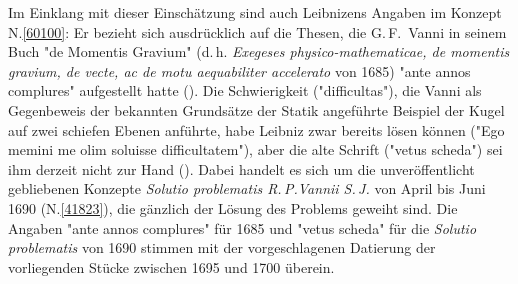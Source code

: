 \begin{ledgroup}
\pstart
Im Einklang mit dieser Einschätzung sind auch Leibnizens Angaben im Konzept N.\;\ref{60100}:
Er bezieht sich ausdrücklich auf die Thesen, die G.\,F.~Vanni in seinem Buch "de Momentis Gravium" (d.\,h. \textit{Exegeses physico-mathematicae, de momentis gravium, de vecte, ac de motu aequabiliter accelerato} von 1685) "ante annos complures" aufgestellt hatte ().
Die Schwierigkeit ("difficultas"), die Vanni als Gegenbeweis der bekannten Grundsätze der Statik angeführte Beispiel der Kugel auf zwei schiefen Ebenen anführte, habe Leibniz zwar bereits lösen können ("Ego memini me olim soluisse difficultatem"), aber die alte Schrift ("vetus scheda") sei ihm derzeit nicht zur Hand ().
Dabei handelt es sich um die unveröffentlicht gebliebenen Konzepte \textit{Solutio problematis R.\,P.\;Vannii S.\,J.} von April bis Juni 1690 (N.\;\ref{41823}), die gänzlich der Lösung des Problems geweiht sind.
Die Angaben "ante annos complures" für 1685 und "vetus scheda" für die \textit{Solutio problematis} von 1690 stimmen mit der vorgeschlagenen Datierung der vorliegenden Stücke zwischen 1695 und 1700 überein.
\pend
\end{ledgroup}

